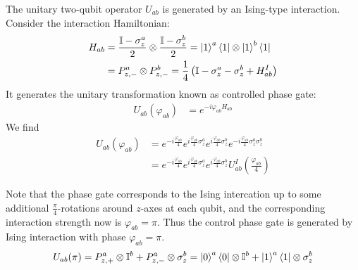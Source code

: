 \documentclass[10pt,a4paper]{book}
\numberwithin{equation}{chapter}
\numberwithin{figure}{chapter}
\numberwithin{table}{chapter}
\begin{document}
The unitary two-qubit operator $U_{ab}$ is generated by an Ising-type interaction. Consider the interaction Hamiltonian:
\begin{align}
\nonumber H_{ab}&=\frac{\mathbb{I}-\sigma^{a}_{z}}{2}\otimes \frac{\mathbb{I}-\sigma^{b}_{z}}{2}=\ket{1}^{a}\bra{1}\otimes \ket{1}^{b}\bra{1} \\ &=  P^{a}_{z,-}\otimes P^{b}_{z,-}= \frac{1}{4}\left( \mathbb{I}- \sigma^{a}_{z}-\sigma^{b}_{z} + H^{I}_{ab} \right)
\end{align}
It generates the unitary transformation known as controlled phase gate:
\begin{align}
U_{ab}\left(\varphi_{ab}\right)&=e^{-i\varphi_{ab}H_{ab}}
\end{align}
We find 
\begin{align}
U_{ab}(\varphi_{ab})&=e^{-i \frac{ \varphi_{ab}}{4}}e^{i \frac{\varphi_{ab}}{4} \sigma^{a}_{z}}e^{i\frac{\varphi_{ab}}{4} \sigma^{b}_{z}}e^{-i\frac{\varphi_{ab}}{4}\sigma^{a}_{z}\sigma^{b}_{z}} \\
&=e^{-i\frac{\varphi_{ab}}{4} }e^{i\frac{\varphi_{ab}}{4} \sigma^{a}_{z}}e^{i\frac{\varphi_{ab}}{4} \sigma^{b}_{z}}U^{I}_{ab}\left(\frac{\varphi_{ab}}{4}\right)
\end{align}

Note that the phase gate corresponds to the Ising intercation up to some additional $\frac{\pi}{4}$-rotations around $z$-axes at each qubit, and the corresponding interaction strength now is $\varphi_{ab}=\pi$. Thus the control phase gate is generated by Ising interaction with phase $\varphi_{ab}=\pi$.
\begin{equation}
U_{ab}(\pi)= P^{a}_{z,+}\otimes \mathbb{I}^{b} + P^{a}_{z,-}\otimes \sigma^{b}_{z}= \ket{0}^{a}\bra{0}\otimes \mathbb{I}^{b} + \ket{1}^{a}\bra{1}\otimes \sigma^{b}_{z}
\end{equation}
\end{document}
